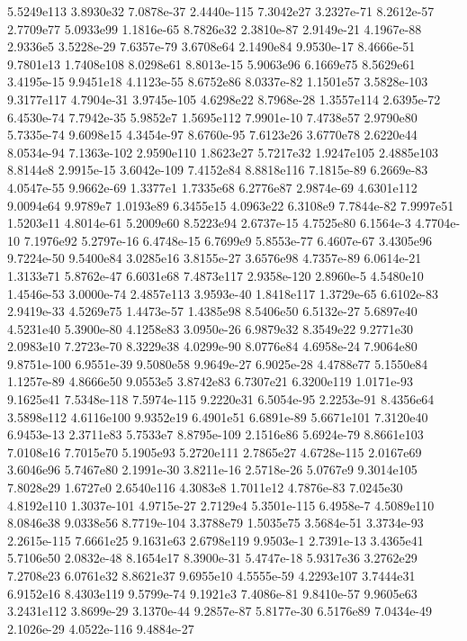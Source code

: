5.5249e113 3.8930e32 7.0878e-37 2.4440e-115 7.3042e27 3.2327e-71 8.2612e-57 2.7709e77 5.0933e99 1.1816e-65 
8.7826e32 2.3810e-87 2.9149e-21 4.1967e-88 2.9336e5 3.5228e-29 7.6357e-79 3.6708e64 2.1490e84 9.9530e-17 
8.4666e-51 9.7801e13 1.7408e108 8.0298e61 8.8013e-15 5.9063e96 6.1669e75 8.5629e61 3.4195e-15 9.9451e18 
4.1123e-55 8.6752e86 8.0337e-82 1.1501e57 3.5828e-103 9.3177e117 4.7904e-31 3.9745e-105 4.6298e22 8.7968e-28 
1.3557e114 2.6395e-72 6.4530e-74 7.7942e-35 5.9852e7 1.5695e112 7.9901e-10 7.4738e57 2.9790e80 5.7335e-74 
9.6098e15 4.3454e-97 8.6760e-95 7.6123e26 3.6770e78 2.6220e44 8.0534e-94 7.1363e-102 2.9590e110 1.8623e27 
5.7217e32 1.9247e105 2.4885e103 8.8144e8 2.9915e-15 3.6042e-109 7.4152e84 8.8818e116 7.1815e-89 6.2669e-83 
4.0547e-55 9.9662e-69 1.3377e1 1.7335e68 6.2776e87 2.9874e-69 4.6301e112 9.0094e64 9.9789e7 1.0193e89 
6.3455e15 4.0963e22 6.3108e9 7.7844e-82 7.9997e51 1.5203e11 4.8014e-61 5.2009e60 8.5223e94 2.6737e-15 
4.7525e80 6.1564e-3 4.7704e-10 7.1976e92 5.2797e-16 6.4748e-15 6.7699e9 5.8553e-77 6.4607e-67 3.4305e96 
9.7224e-50 9.5400e84 3.0285e16 3.8155e-27 3.6576e98 4.7357e-89 6.0614e-21 1.3133e71 5.8762e-47 6.6031e68 
7.4873e117 2.9358e-120 2.8960e-5 4.5480e10 1.4546e-53 3.0000e-74 2.4857e113 3.9593e-40 1.8418e117 1.3729e-65 
6.6102e-83 2.9419e-33 4.5269e75 1.4473e-57 1.4385e98 8.5406e50 6.5132e-27 5.6897e40 4.5231e40 5.3900e-80 
4.1258e83 3.0950e-26 6.9879e32 8.3549e22 9.2771e30 2.0983e10 7.2723e-70 8.3229e38 4.0299e-90 8.0776e84 
4.6958e-24 7.9064e80 9.8751e-100 6.9551e-39 9.5080e58 9.9649e-27 6.9025e-28 4.4788e77 5.1550e84 1.1257e-89 
4.8666e50 9.0553e5 3.8742e83 6.7307e21 6.3200e119 1.0171e-93 9.1625e41 7.5348e-118 7.5974e-115 9.2220e31 
6.5054e-95 2.2253e-91 8.4356e64 3.5898e112 4.6116e100 9.9352e19 6.4901e51 6.6891e-89 5.6671e101 7.3120e40 
6.9453e-13 2.3711e83 5.7533e7 8.8795e-109 2.1516e86 5.6924e-79 8.8661e103 7.0108e16 7.7015e70 5.1905e93 
5.2720e111 2.7865e27 4.6728e-115 2.0167e69 3.6046e96 5.7467e80 2.1991e-30 3.8211e-16 2.5718e-26 5.0767e9 
9.3014e105 7.8028e29 1.6727e0 2.6540e116 4.3083e8 1.7011e12 4.7876e-83 7.0245e30 4.8192e110 1.3037e-101 
4.9715e-27 2.7129e4 5.3501e-115 6.4958e-7 4.5089e110 8.0846e38 9.0338e56 8.7719e-104 3.3788e79 1.5035e75 
3.5684e-51 3.3734e-93 2.2615e-115 7.6661e25 9.1631e63 2.6798e119 9.9503e-1 2.7391e-13 3.4365e41 5.7106e50 
2.0832e-48 8.1654e17 8.3900e-31 5.4747e-18 5.9317e36 3.2762e29 7.2708e23 6.0761e32 8.8621e37 9.6955e10 
4.5555e-59 4.2293e107 3.7444e31 6.9152e16 8.4303e119 9.5799e-74 9.1921e3 7.4086e-81 9.8410e-57 9.9605e63 
3.2431e112 3.8699e-29 3.1370e-44 9.2857e-87 5.8177e-30 6.5176e89 7.0434e-49 2.1026e-29 4.0522e-116 9.4884e-27 
